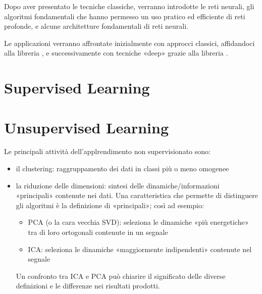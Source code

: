 \documentclass[letterpaper,10pt,italian]{jupyterBook}
\begin{document}
\sphinxAtStartPar
Dopo aver presentato le tecniche classiche, verranno introdotte le reti neurali, gli algoritmi fondamentali che hanno permesso un uso pratico ed efficiente di reti profonde, e alcune architetture fondamentali di reti neurali.

\sphinxAtStartPar
Le applicazioni verranno affrontate inizialmente con approcci classici, affidandoci alla libreria , e successivamente con tecniche «deep» grazie alla libreria .

\sphinxstepscope


\chapter{Supervised Learning}
\label{\detokenize{ch/ai/sl:supervised-learning}}\label{\detokenize{ch/ai/sl:ai-sl}}\label{\detokenize{ch/ai/sl::doc}}
\sphinxstepscope


\chapter{Unsupervised Learning}
\label{\detokenize{ch/ai/ul:unsupervised-learning}}\label{\detokenize{ch/ai/ul:ai-ul}}\label{\detokenize{ch/ai/ul::doc}}
\sphinxAtStartPar
Le principali attività dell’applrendimento non supervisionato sono:
\begin{itemize}
\item {} 
\sphinxAtStartPar
il clustering: raggruppamento dei dati in classi più o meno omogenee

\item {} 
\sphinxAtStartPar
la riduzione delle dimensioni: sintesi delle dinamiche/informazioni «principali» contenute nei dati. Una caratteristica che permette di distinguere gli algoritmi è la definizione di «principali»; così ad esempio:
\begin{itemize}
\item {} 
\sphinxAtStartPar
PCA (o la cara vecchia SVD): seleziona le dinamiche «più energetiche» tra di loro ortogonali contenute in un segnale

\item {} 
\sphinxAtStartPar
ICA: seleziona le dinamiche «maggiormente indipendenti» contenute nel segnale

\end{itemize}

\sphinxAtStartPar
Un confronto tra ICA e PCA può chiarire il significato delle diverse definizioni e le differenze nei risultati prodotti.

\end{itemize}
\end{document}

